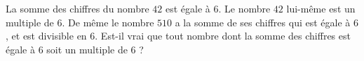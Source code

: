 
\begin{exercice}\label{exosmath-0787}

    La somme des chiffres du nombre \( 42\) est égale à \( 6\). Le nombre \( 42\) lui-même est un multiple de \( 6\). De même le nombre \( 510\) a la somme de ses chiffres qui est égale à \( 6\), et est divisible en \( 6\). Est-il vrai que tout nombre dont la somme des chiffres est égale à \( 6\) soit un multiple de \( 6\) ?

\end{exercice}
